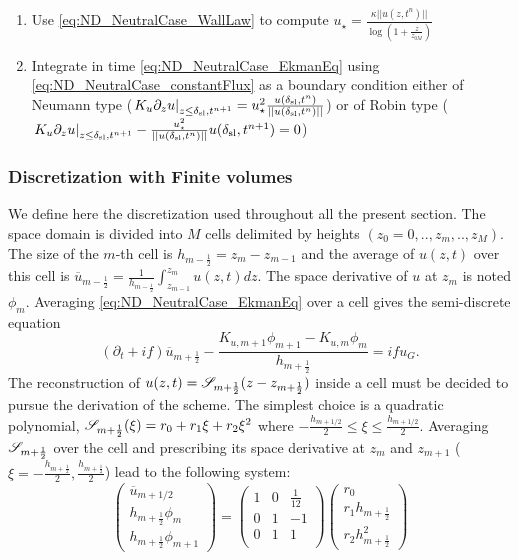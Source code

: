 \begin{enumerate}
  \item Use \eqref{eq:ND_NeutralCase_WallLaw} to compute 
	  $u_\star = \frac{\kappa ||u(z, t^n)||}
			{\log(1+\frac{z}{z_{0M}})}$
  \item Integrate in time \eqref{eq:ND_NeutralCase_EkmanEq}
  using \eqref{eq:ND_NeutralCase_constantFlux} as a boundary condition
		either of Neumann type ($\left.K_u \partial_z u
		\right|_{z\leq \delta_{\rm sl}, t^{n+1}}
	= u_\star^2 \frac{u(\delta_{\rm sl}, t^n)}
		{||u(\delta_{\rm sl}, t^n)||}$)
		or of Robin type ($\left.K_u \partial_z u
		\right|_{z\leq \delta_{\rm sl}, t^{n+1}}
		- \frac{u_\star^2} {||u(\delta_{\rm sl}, t^n)||}
		u(\delta_{\rm sl}, t^{n+1}) = 0$)
\end{enumerate}

\subsubsection{Discretization with Finite volumes}
We define here the discretization used throughout all the present
section. The space domain is divided into $M$ cells delimited by
heights $(z_0=0, .., z_m, .., z_M)$. The size of the $m$-th cell
is $h_{m-\frac{1}{2}}=z_{m}-z_{m-1}$ and the average of $u(z, t)$
over this cell is 
$\overline{u}_{m-\frac{1}{2}}=\frac{1} {h_{m-\frac{1}{2}}}
\int_{z_{m-1}}^{z_m}u(z, t)dz$.
The space derivative of $u$ at $z_m$ is noted $\phi_{m}$.
Averaging \eqref{eq:ND_NeutralCase_EkmanEq} over a cell gives
the semi-discrete equation
\begin{equation}
\label{eq:ND_NeutralCase_semiDiscreteEkmanEq}
	(\partial_t + if) \overline{u}_{m+\frac{1}{2}} - 
	\frac{K_{u, m+1} \phi_{m+1} - K_{u, m} \phi_{m}}
		{h_{m+\frac{1}{2}}} = i f u_G.
\end{equation}
The reconstruction of $u(z, t) = {\cal S}_{m+\frac{1}{2}}
				(z - z_{m+\frac{1}{2}})$
				inside a cell must be decided
to pursue the derivation of the scheme. The simplest choice is
a quadratic polynomial,
${\cal S}_{m+\frac{1}{2}}(\xi) = r_0 + r_1 \xi + r_2 \xi^2$ where
$-\frac{h_{m+1/2}}{2} \leq \xi \leq \frac{h_{m+1/2}}{2}$.
Averaging ${\cal S}_{m+\frac{1}{2}}$ over the cell and
prescribing its space derivative at $z_{m}$ and $z_{m+1}$
($\xi=-\frac{h_{m+\frac{1}{2}}}{2}, \frac{h_{m+\frac{1}{2}}}{2}$)
lead to the following system:
\begin{equation}
    \begin{pmatrix}
    \overline{u}_{m+1/2} \\
    h_{m+\frac{1}{2}} \phi_m \\
	    h_{m+\frac{1}{2}} \phi_{m+1}
    \end{pmatrix} = 
    \begin{pmatrix}
    1 & 0 & \frac{1}{12} \\
    0 & 1 & -1 \\
    0 & 1 & 1 \\
    \end{pmatrix}
    \begin{pmatrix}
    r_0 \\
    r_1 h_{m+\frac{1}{2}} \\
    r_2 h_{m+\frac{1}{2}}^2
    \end{pmatrix}
\end{equation}
